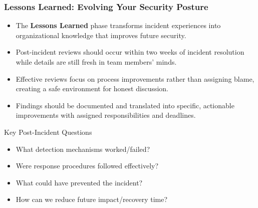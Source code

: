 \documentclass{beamer}
\begin{document}
\begin{frame}
\frametitle{Lessons Learned: Evolving Your Security Posture}
\begin{itemize}
\item The \textbf{Lessons Learned} phase transforms incident experiences into organizational knowledge that improves future security.
\item Post-incident reviews should occur within two weeks of incident resolution while details are still fresh in team members' minds.
\item Effective reviews focus on process improvements rather than assigning blame, creating a safe environment for honest discussion.
\item Findings should be documented and translated into specific, actionable improvements with assigned responsibilities and deadlines.
\end{itemize}

\begin{exampleblock}{Key Post-Incident Questions}
\begin{itemize}
\item What detection mechanisms worked/failed?
\item Were response procedures followed effectively?
\item What could have prevented the incident?
\item How can we reduce future impact/recovery time?
\end{itemize}
\end{exampleblock}
\end{frame}
\end{document}
